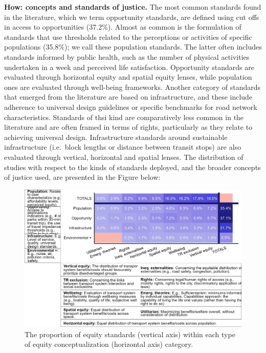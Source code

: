\documentclass[12pt, oneside]{report}
\begin{document}
\textbf{How: concepts and standards of justice.} The most common
standards found in the literature, which we term opportunity standards,
are defined using cut offs in access to opportunities (37.2\%). Almost
as common is the formulation of standards that use thresholds related to
the perceptions or activities of specific populations (35.8\%); we call
these population standards. The latter often includes standards informed
by public health, such as the number of physical activities undertaken
in a week and perceived life satisfaction. Opportunity standards are
evaluated through horizontal equity and spatial equity lenses, while
population ones are evaluated through well-being frameworks. Another
category of standards that emerged from the literature are based on
infrastructure, and these include adherence to universal design
guidelines or specific benchmarks for road network characteristics.
Standards of thsi kind are comparatively less common in the literature
and are often framed in terms of rights, particularly as they relate to
achieving universal design. Infrastructure standards around sustainable
infrastructure (i.e.~block lengths or distance between transit stops)
are also evaluated through vertical, horizontal and spatial lenses. The
distribution of studies with respect to the kinds of standards deployed,
and the broader concepts of justice used, are presented in the Figure
below:

\begin{figure}

{\centering \includegraphics{figures/standards_conc_percentages_plot_and_table.png}

}

\caption{The proportion of equity standards (vertical axis) within each
type of equity conceptualization (horizontal axis) category.}

\end{figure}
\end{document}
